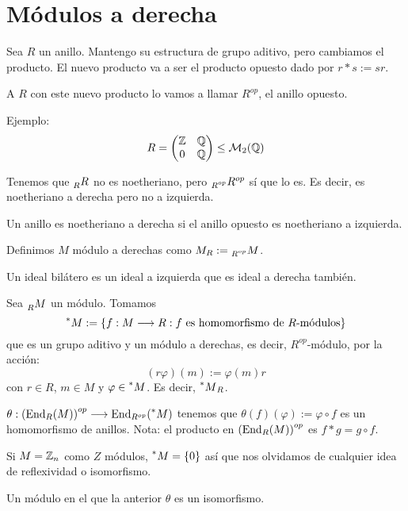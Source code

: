 \section{Módulos a derecha}
\begin{df}
Sea \(R\) un anillo. Mantengo su estructura de grupo aditivo, pero cambiamos
el producto. El nuevo producto va a ser el producto opuesto dado por
\(r*s:=sr\).

  A \(R\) con este nuevo producto lo vamos a llamar \(R^{op}\), el anillo
  opuesto.
\end{df}

Ejemplo: \[
  R=
  \begin{pmatrix}
    \mathbb{Z}&\mathbb{Q}\\
    0&\mathbb{Q}
  \end{pmatrix}
  \le \mathcal{M}_2(\mathbb{Q})
\]

Tenemos que \(\prescript{}{R}{R}\) no es noetheriano, pero
\(\prescript{}{R^{op}}{R^{op}}\) sí que lo es.
Es decir, es noetheriano a derecha pero no a izquierda.

\begin{df}
  Un anillo es noetheriano a derecha si el anillo opuesto es noetheriano
  a izquierda.
\end{df}
\begin{df}
  Definimos \(M\) módulo a derechas como \(M_R:=\prescript{}{R^{op}}{M}\).
\end{df}

\begin{df}
  Un ideal bilátero es un ideal a izquierda que es ideal a derecha también.
\end{df}

\begin{df}
  Sea \(\prescript{}{R}{M}\) un módulo. Tomamos
  \[
    \prescript{*}{}{M}:=\{f:M\longrightarrow R: f
    \textrm{ es homomorfismo de \(R\)-módulos}\}
  \]
  que es un grupo aditivo y un módulo a derechas, es decir,
  \(R^{op}\)-módulo, por la acción:
  \[
    (r\varphi)(m):=\varphi(m)r
  \]
  con \(r\in R\), \(m\in M\) y \(\varphi\in \prescript{*}{}{M}\).
  Es decir, \(\prescript{*}{}{M}_R\).
\end{df}

\begin{lema}
  \(\theta:{(\operatorname{End}_R(M))}^{op}
  \longrightarrow\operatorname{End}_{R^{op}}(\prescript{*}{}{M})\)
  tenemos que \(\theta(f)(\varphi):=\varphi\circ f\) es un homomorfismo
  de anillos.
  Nota: el producto en \({(\operatorname{End}_R(M))}^{op}\) es \(f*g=g\circ f\).
\end{lema}

Si \(M=\mathbb{Z}_n\) como \(Z\) módulos, \(\prescript{*}{}{M}=\{0\}\) así que
nos olvidamos de cualquier idea de reflexividad o isomorfismo.

\begin{df}
  Un módulo en el que la anterior \(\theta\) es un isomorfismo.
\end{df}

